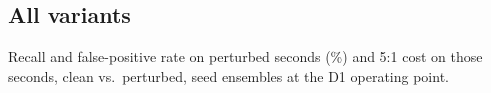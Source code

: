 {\footnotesize}

\subsection{All variants}
Recall and false-positive rate on perturbed seconds (\%) and 5:1 cost on those seconds, clean vs.\ perturbed, seed ensembles at the D1 operating point.

{\scriptsize\setlength{\tabcolsep}{2.5pt}}
